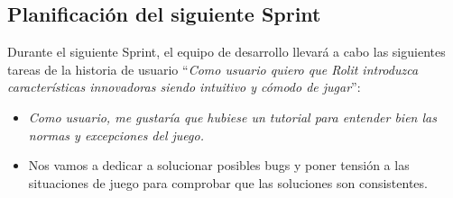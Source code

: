 \documentclass[../../SCRUM.tex]{subfiles}
\begin{document}
\subsection{Planificación del siguiente Sprint}
Durante el siguiente Sprint, el equipo de desarrollo llevará a cabo las siguientes tareas de la historia de usuario ``\textit{Como usuario quiero que Rolit introduzca características innovadoras siendo intuitivo y cómodo de jugar}'':
\begin{itemize}
\item \textit{Como usuario, me gustaría que hubiese un tutorial para entender bien las normas y excepciones del juego.}
\item Nos vamos a dedicar a solucionar posibles bugs y poner tensión a las situaciones de juego para comprobar que las soluciones son consistentes.
\end{itemize}
\end{document}
